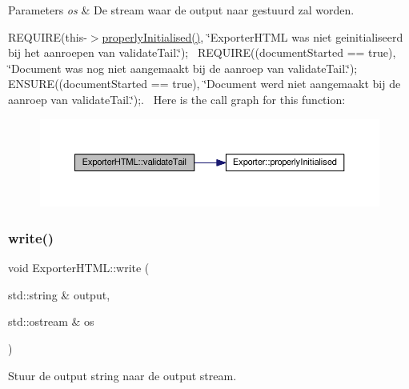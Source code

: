 \begin{DoxyParams}{Parameters}
{\em os} & De stream waar de output naar gestuurd zal worden.\\
\hline
\end{DoxyParams}
R\+E\+Q\+U\+I\+RE(this-\/$>$\hyperlink{class_exporter_aafd9df9210aeefd7bb7fd434fc317cf0}{properly\+Initialised()}, \char`\"{}\+Exporter\+H\+T\+M\+L was niet geinitialiseerd bij het aanroepen van validate\+Tail.\char`\"{});~\newline
R\+E\+Q\+U\+I\+RE((document\+Started == true), \char`\"{}\+Document was nog niet aangemaakt bij de aanroep van validate\+Tail.\char`\"{}); E\+N\+S\+U\+RE((document\+Started == true), \char`\"{}\+Document werd niet aangemaakt bij de aanroep van validate\+Tail.\char`\"{});.~\newline
Here is the call graph for this function\+:
\nopagebreak
\begin{figure}[H]
\begin{center}
\leavevmode
\includegraphics[width=350pt]{class_exporter_h_t_m_l_a82a0ea3877a2ea4b167281016c46f4ad_cgraph}
\end{center}
\end{figure}
\mbox{\label{class_exporter_h_t_m_l_ace2649c240282289d4cb3bfbd19e427c}} 
\subsubsection{\texorpdfstring{write()}{write()}}
{\footnotesize\ttfamily void Exporter\+H\+T\+M\+L\+::write (\begin{DoxyParamCaption}\item[{std\+::string \&}]{output,  }\item[{std\+::ostream \&}]{os }\end{DoxyParamCaption})\hspace{0.3cm}{\ttfamily [virtual]}}



Stuur de output string naar de output stream. 


